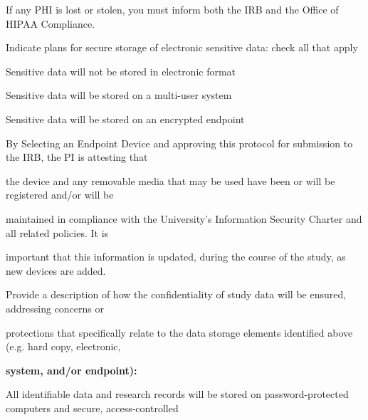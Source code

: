 \documentclass[10pt, letterpaper]{article}
\begin{document}
If any PHI is lost or stolen, you must inform both the IRB and the Office of HIPAA Compliance.

\vspace{0.5em}

\vspace{0.5em}

\vspace{0.5em}

Indicate plans for secure storage of electronic sensitive data: check all that apply

\noindent \makebox[0pt][l]{$\square$}\hspace{1.2em}Sensitive data will not be stored in electronic format

\noindent \makebox[0pt][l]{$\square$}\hspace{1.2em}Sensitive data will be stored on a multi-user system

\noindent \makebox[0pt][l]{\color{columbiablue_official}$\boxtimes$}\hspace{1.2em}Sensitive data will be stored on an encrypted endpoint

\vspace{0.5em}

\vspace{0.5em}

\vspace{0.5em}

By Selecting an Endpoint Device and approving this protocol for submission to the IRB, the PI is attesting that

the device and any removable media that may be used have been or will be registered and/or will be

maintained in compliance with the University's Information Security Charter and all related policies. It is

important that this information is updated, during the course of the study, as new devices are added.

\vspace{0.5em}

\vspace{0.5em}

Provide a description of how the confidentiality of study data will be ensured, addressing concerns or

protections that specifically relate to the data storage elements identified above (e.g. hard copy, electronic,

\noindent \textbf{system, and/or endpoint):}

All identifiable data and research records will be stored on password-protected computers and secure, access-controlled
\end{document}
